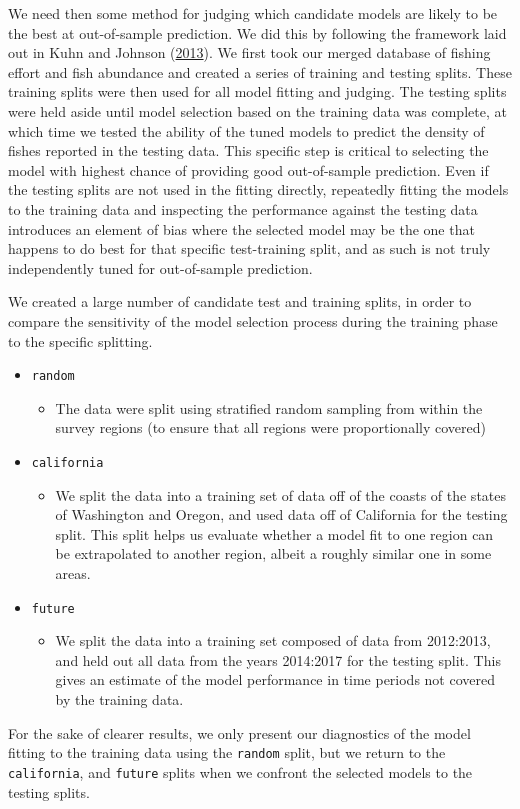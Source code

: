 \documentclass[twoside,12pt,final]{ucthesis-CA2012}
\providecommand{\tightlist}{%
  \setlength{\itemsep}{0pt}\setlength{\parskip}{0pt}}
\begin{document}
\begin{ucmainmatter}
We need then some method for judging which candidate models are likely
to be the best at out-of-sample prediction. We did this by following the
framework laid out in Kuhn and Johnson
(\protect\hyperlink{ref-Kuhn2013}{2013}). We first took our merged
database of fishing effort and fish abundance and created a series of
training and testing splits. These training splits were then used for
all model fitting and judging. The testing splits were held aside until
model selection based on the training data was complete, at which time
we tested the ability of the tuned models to predict the density of
fishes reported in the testing data. This specific step is critical to
selecting the model with highest chance of providing good out-of-sample
prediction. Even if the testing splits are not used in the fitting
directly, repeatedly fitting the models to the training data and
inspecting the performance against the testing data introduces an
element of bias where the selected model may be the one that happens to
do best for that specific test-training split, and as such is not truly
independently tuned for out-of-sample prediction.

We created a large number of candidate test and training splits, in
order to compare the sensitivity of the model selection process during
the training phase to the specific splitting.
\begin{itemize}
\tightlist
\item
  \texttt{random}
  \begin{itemize}
  \tightlist
  \item
    The data were split using stratified random sampling from within the
    survey regions (to ensure that all regions were proportionally
    covered)
  \end{itemize}
\item
  \texttt{california}
  \begin{itemize}
  \tightlist
  \item
    We split the data into a training set of data off of the coasts of
    the states of Washington and Oregon, and used data off of California
    for the testing split. This split helps us evaluate whether a model
    fit to one region can be extrapolated to another region, albeit a
    roughly similar one in some areas.
  \end{itemize}
\item
  \texttt{future}
  \begin{itemize}
  \tightlist
  \item
    We split the data into a training set composed of data from
    2012:2013, and held out all data from the years 2014:2017 for the
    testing split. This gives an estimate of the model performance in
    time periods not covered by the training data.
  \end{itemize}
\end{itemize}
For the sake of clearer results, we only present our diagnostics of the
model fitting to the training data using the \texttt{random} split, but
we return to the \texttt{california}, and \texttt{future} splits when we
confront the selected models to the testing splits.


\end{ucmainmatter}
\end{document}
